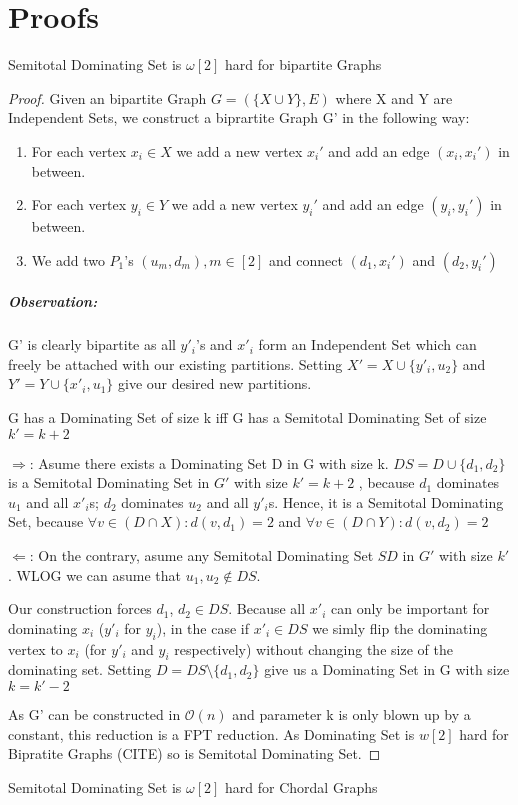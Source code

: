\chapter{Proofs}

\begin{theorem}
    Semitotal Dominating Set is $\omega[2]$ hard for bipartite Graphs
\end{theorem}

\begin{proof}
    Given an bipartite Graph $G = ( \{X \cup Y\}, E)$ where X and Y are Independent Sets, we construct a biprartite Graph G' in the following way:
    \begin{enumerate}
        \item For each vertex $x_i \in X$ we add a new vertex $x_i'$  and add an edge $(x_i, x_i')$ in between.
        \item For each vertex $y_i \in Y$ we add a new vertex $y_i'$ and add an edge $(y_i, y_i')$ in between.
        \item We add two $P_1$'s $(u_m, d_m), m \in [2]$ and connect $(d_1, x_i')$ and $(d_2, y_i')$ 
    \end{enumerate}
    \paragraph*{Observation:} G' is clearly bipartite as all $y'_i$'s and $x'_i$ form an Independent Set which can freely be attached with our existing partitions. Setting  $X' = X \cup \{y'_i, u_2\}$ and $Y' = Y \cup \{x'_i, u_1\}$ give our desired new partitions.

    \begin{corollary} G has a Dominating Set of size k iff G has a Semitotal Dominating Set of size $k' = k + 2$
    \end{corollary} 
     $\Rightarrow$: Asume there exists a Dominating Set D in G with size k. $DS = D\cup \{d_1,d_2\}$ is a Semitotal Dominating Set in $G'$ with size $k' = k+2 $ , because $d_1$ dominates $u_1$ and all $x'_i$s; $d_2$ dominates $u_2$ and all $y'_i$s. Hence, it is a Semitotal Dominating Set, because $\forall v \in (D \cap X): d(v, d_1) = 2$ and $\forall v \in (D \cap Y): d(v, d_2) = 2$

    $\Leftarrow$: On the contrary, asume any Semitotal Dominating Set $SD$ in $G'$ with size $k'$. WLOG we can asume that $u_1, u_2 \notin DS$. 
    
    Our construction forces $d_1$, $d_2 \in DS$. Because all $x'_i$ can only be important for dominating $x_i$ ($y'_i$ for $y_i$), in the case if $x'_i \in DS$ we simly flip the dominating vertex to $x_i$ (for $y'_i$ and $y_i$ respectively) without changing the size of the dominating set. Setting $D = DS \setminus \{ d_1,d_2\}$ give us a Dominating Set in G with size $ k = k' - 2$

    As G' can be constructed in $\mathcal{O}(n)$ and parameter k is only blown up by a constant, this reduction is a FPT reduction. As Dominating Set is $w[2]$ hard for Bipratite Graphs (CITE) so is Semitotal Dominating Set.

\end{proof}

\begin{theorem}
    Semitotal Dominating Set is $\omega[2]$ hard for Chordal Graphs
\end{theorem}
    
